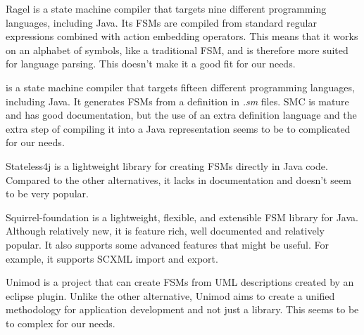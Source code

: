 Ragel is a state machine compiler that targets nine different programming languages, including Java.
Its FSMs are compiled from standard regular expressions combined with action embedding operators.
This means that it works on an alphabet of symbols, like a traditional FSM, and is therefore more suited for language parsing.
This doesn't make it a good fit for our needs.

 is a state machine compiler that targets fifteen different programming languages, including Java.
It generates FSMs from a definition in \textit{.sm} files.
SMC is mature and has good documentation, but the use of an extra definition language and the extra step of compiling it into a Java representation seems to be to complicated for our needs.

Stateless4j is a lightweight library for creating FSMs directly in Java code.
Compared to the other alternatives, it lacks in documentation and doesn't seem to be very popular.

Squirrel-foundation is a lightweight, flexible, and extensible FSM library for Java.
Although relatively new, it is feature rich, well documented and relatively popular.
It also supports some advanced features that might be useful.
For example, it supports SCXML import and export.

Unimod is a project that can create FSMs from UML descriptions created by an eclipse plugin.
Unlike the other alternative, Unimod aims to create a unified methodology for application development and not just a library.
This seems to be to complex for our needs.
